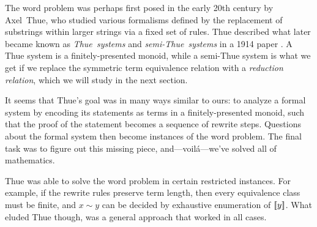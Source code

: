 \documentclass[../generics]{subfiles}
\begin{document}
The word problem was perhaps first posed in the early 20th century by Axel~Thue, who studied various formalisms defined by the replacement of substrings within larger strings via a fixed set of rules. Thue described what later became known as \emph{Thue~systems} and \emph{semi-Thue~systems} in a 1914 paper \cite{thue_translation}. A Thue system is a finitely-presented monoid, while a semi-Thue system is what we get if we replace the symmetric term equivalence relation with a \emph{reduction relation}, which we will study in the next section.

It seems that Thue's goal was in many ways similar to ours: to analyze a formal system by encoding its statements as terms in a finitely-presented monoid, such that the proof of the statement becomes a sequence of rewrite steps. Questions about the formal system then become instances of the word problem. The final task was to figure out this missing piece, and---voil\'a---we've solved all of mathematics.

Thue was able to solve the word problem in certain restricted instances. For example, if the rewrite rules preserve term length, then every equivalence class must be finite, and $x\sim y$ can be decided by exhaustive enumeration of $[\![y]\!]$. What eluded Thue though, was a general approach that worked in all cases.
\end{document}
